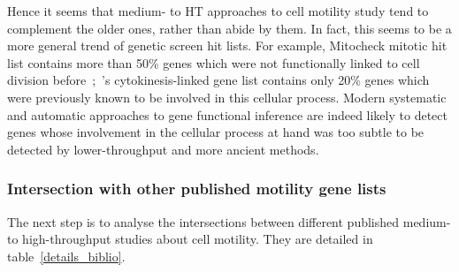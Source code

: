 Hence it seems that medium- to HT approaches to cell motility study
tend to complement the older ones, rather than abide by them. 
In fact, this seems to be a more general trend of genetic screen hit lists. For
example, Mitocheck mitotic hit list contains more than 50\% genes
which were not functionally linked to cell division
before~\cite{pmid20360735};~\cite{pmid15547975}'s cytokinesis-linked
gene list contains only 20\% genes which were previously known to be
involved in this cellular process. Modern systematic and automatic
approaches to gene functional inference are indeed likely to detect
genes whose involvement in the cellular process at hand was too subtle
to be detected by lower-throughput and more ancient methods. 

%
%

\subsubsection{Intersection with other published motility gene lists }
The next step is to analyse the intersections between different published
medium- to high-throughput studies 
about cell motility. They are detailed in table~\ref{details_biblio}. 

